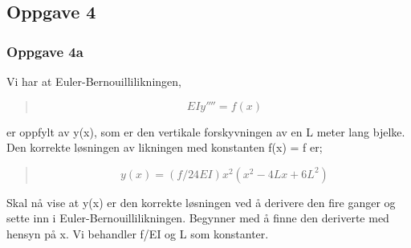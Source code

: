 \subsection{Oppgave 4}
\subsubsection{Oppgave 4a}
Vi har at Euler-Bernouillilikningen,
\begin{quote}
\begin{equation}
EIy'''' = f(x)
\end{equation}
\end{quote}
er oppfylt av y(x), som er den vertikale forskyvningen av en L meter lang bjelke. Den korrekte løsningen av likningen med konstanten f(x) = f er;
\begin{quote}
\begin{equation}\label{eq:oppgave4}
y(x)=(f/24EI) x^2 (x^2-4Lx+6L^2)
\end{equation}
\end{quote}
Skal nå vise at y(x) er den korrekte løsningen ved å derivere den fire ganger og sette inn i Euler-Bernouillilikningen. Begynner med å finne den deriverte med hensyn på x. Vi behandler f/EI og L som konstanter.

